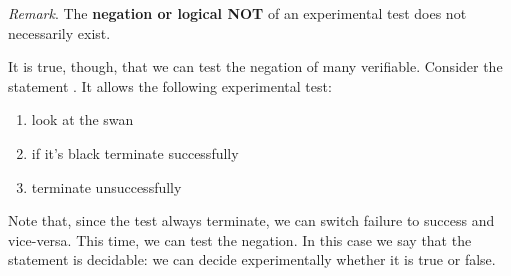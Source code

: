 \documentclass[11pt,letterpaper,fleqn]{memoir} %
\begin{document}
\begin{mathSection}
	\emph{Remark}. The \textbf{negation or logical NOT} of an experimental test does not necessarily exist.
\end{mathSection}

It is true, though, that we can test the negation of many verifiable. Consider the statement . It allows the following experimental test:
\begin{enumerate}
	\item look at the swan
	\item if it's black terminate successfully
	\item terminate unsuccessfully
\end{enumerate}
Note that, since the test always terminate, we can switch failure to success and vice-versa. This time, we can test the negation. In this case we say that the statement is decidable: we can decide experimentally whether it is true or false.
\end{document}
